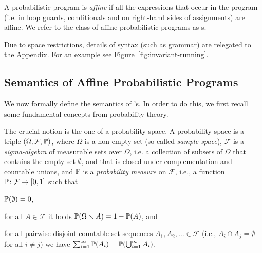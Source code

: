 \smallskip{}
A probabilistic program is \emph{affine} if all the expressions that occur in 
the program (i.e. in loop guards, conditionals and on right-hand sides of 
assignments) are affine. We refer to the class of affine probabilistic programs 
as \APP s.

Due to space restrictions, details of syntax (such as grammar) are relegated to 
the Appendix.
For an example see Figure~\ref{fig:invariant-running}.




\vspace{-1em}
\subsection{Semantics of Affine Probabilistic Programs}\label{subsec:semantics}
\vspace{-0.5em}

We now formally define the semantics of \APP's.
In order to do this, we first recall some fundamental concepts from probability
theory.

\smallskip{}
The crucial notion is the one of a probability space. A probability space is a triple
$(\Omega,\mathcal{F},\mathbb{P})$, where $\Omega$ is a non-empty set (so called
\emph{sample space}), $\mathcal{F}$ is a \emph{sigma-algebra} of measurable 
sets over $\Omega$,
i.e. a collection of subsets of $\Omega$ that contains the empty set
$\emptyset$, and that is closed under complementation and countable unions, and
$\mathbb{P}$ is a \emph{probability measure} on $\mathcal{F}$, i.e., a function
$\mathbb{P}\colon \mathcal{F}\rightarrow[0,1]$ such that
\begin{compactitem}
\item $\mathbb{P}(\emptyset)=0$,
\item for all $A\in \mathcal{F}$ it holds $\mathbb{P}(\Omega\smallsetminus
A)=1-\mathbb{P}(A)$, and
\item for all pairwise disjoint countable set sequences $A_1,A_2,\dots \in
\mathcal{F}$ (i.e., $A_i \cap A_j = \emptyset$ for all $i\neq j$)
we have $\sum_{i=1}^{\infty}\mathbb{P}(A_i)=\mathbb{P}(\bigcup_{i=1}^{\infty} A_i)$.
\end{compactitem}

